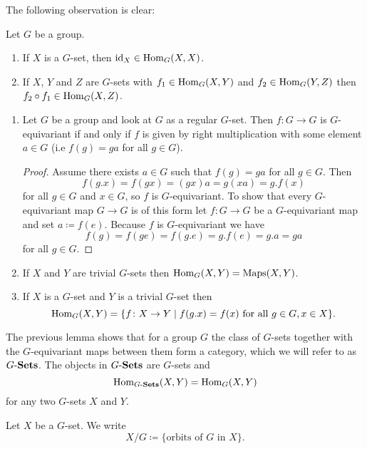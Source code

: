 The following observation is clear:


\begin{lem}
  Let $G$ be a group.
  \begin{enumerate}[label=\emph{\alph*)},leftmargin=*]
    \item
      If $X$ is a $G$-set, then $\operatorname{id}_X \in \operatorname{Hom}_G(X,X)$.
    \item
      If $X$, $Y$ and $Z$ are $G$-sets with $f_1 \in \operatorname{Hom}_G(X,Y)$ and $f_2 \in \operatorname{Hom}_G(Y,Z)$ then $f_2 \circ f_1 \in \operatorname{Hom}_G(X,Z)$.
  \end{enumerate}
\end{lem}


\begin{expls}
  \begin{enumerate}[label=\emph{\alph*)},leftmargin=*]
    \item
      Let $G$ be a group and look at $G$ as a regular $G$-set. Then $f \colon G \to G$ is $G$-equivariant if and only if $f$ is given by right multiplication with some element $a \in G$ (i.e $f(g) = ga$ for all $g \in G$).
      \begin{proof}
        Assume there exists $a \in G$ such that $f(g) = ga$ for all $g \in G$. Then
        \[
          f(g.x) = f(gx) = (gx)a = g(xa) = g.f(x)
        \]
        for all $g \in G$ and $x \in G$, so $f$ is $G$-equivariant. To show that every $G$-equivariant map $G \to G$ is of this form let $f \colon G \to G$ be a $G$-equivariant map and set $a \coloneqq f(e)$. Because $f$ is $G$-equivariant we have
        \[
          f(g) = f(ge) = f(g.e) = g.f(e) = g.a = ga
        \]
        for all $g \in G$.
      \end{proof}
    \item
      If $X$ and $Y$ are trivial $G$-sets then $\operatorname{Hom}_G(X,Y) = \operatorname{Maps}(X,Y)$.
    \item
      If $X$ is a $G$-set and $Y$ is a trivial $G$-set then
      \[
        \operatorname{Hom}_G(X,Y) = \{f \colon X \to Y \mid f(g.x) = f(x) \text{ for all } g \in G, x \in X\}.
      \]
  \end{enumerate}
\end{expls}


The previous lemma shows that for a group $G$ the class of $G$-sets together with the $G$-equivariant maps between them form a category, which we will refer to as $G\text{-}\mathbf{Sets}$. The objects in $G\text{-}\mathbf{Sets}$ are $G$-sets and
\[
  \operatorname{Hom}_{G\text{-}\mathbf{Sets}}(X,Y) = \operatorname{Hom}_G(X,Y)
\]
for any two $G$-sets $X$ and $Y$.


\begin{defi}
  Let $X$ be a $G$-set. We write
  \[
    X/G \coloneqq \{\text{orbits of $G$ in $X$}\}.
  \]
\end{defi}



